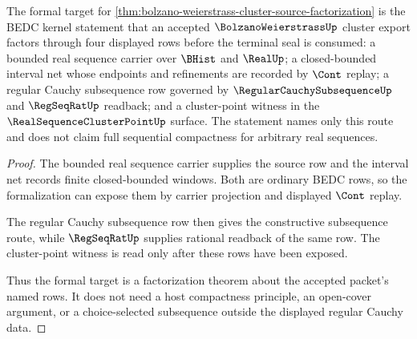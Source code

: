 \begin{theorem}
\label{thm:cluster-source-factorization-formal-target}
The formal target for \autoref{thm:bolzano-weierstrass-cluster-source-factorization} is the BEDC kernel statement that an accepted $\BolzanoWeierstrassUp$ cluster export factors through four displayed rows before the terminal seal is consumed: a bounded real sequence carrier over $\BHist$ and $\RealUp$; a closed-bounded interval net whose endpoints and refinements are recorded by $\Cont$ replay; a regular Cauchy subsequence row governed by $\RegularCauchySubsequenceUp$ and $\RegSeqRatUp$ readback; and a cluster-point witness in the $\RealSequenceClusterPointUp$ surface. The statement names only this route and does not claim full sequential compactness for arbitrary real sequences.
\end{theorem}
\begin{proof}
The bounded real sequence carrier supplies the source row and the interval net records finite closed-bounded windows. Both are ordinary BEDC rows, so the formalization can expose them by carrier projection and displayed $\Cont$ replay.

The regular Cauchy subsequence row then gives the constructive subsequence route, while $\RegSeqRatUp$ supplies rational readback of the same row. The cluster-point witness is read only after these rows have been exposed.

Thus the formal target is a factorization theorem about the accepted packet's named rows. It does not need a host compactness principle, an open-cover argument, or a choice-selected subsequence outside the displayed regular Cauchy data.
\end{proof}
